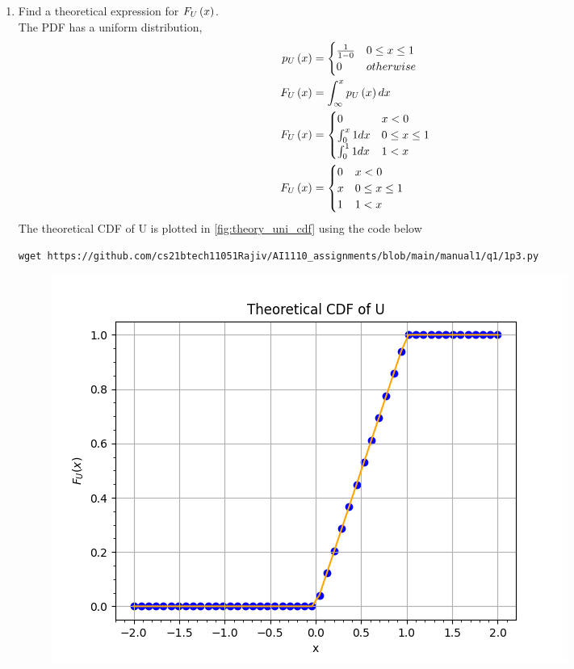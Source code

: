 \documentclass[journal,12pt,twocolumn]{IEEEtran}
\renewcommand\thesection{\arabic{section}}
\begin{document}
\begin{enumerate}[label=\thesection.\arabic*
,ref=\thesection.\theenumi]
%
\item
Find a theoretical expression for $F_{U}\left(x\right)$.
\\
\solution The PDF has a uniform distribution,
\begin{align}
    p_U\left(x\right) &=
        \begin{cases}\frac{1}{1-0} & 0 \le x \le 1 \\
        0 & otherwise
    \end{cases}\\
    F_{U}\left(x\right) &= \int^{x}_{\infty} p_U\left(x\right) dx \\
    F_U\left(x\right) &=
    \begin{cases}  
        0 & x < 0\\
        \int^{x}_{0} 1 dx & 0 \le x \le 1 \\
        \int^{1}_{0} 1 dx & 1 < x
    \end{cases}\\
    F_U\left(x\right) &=
    \begin{cases}  
        0 & x < 0\\
        x & 0 \le x \le 1 \\
        1 & 1 < x
    \end{cases}
    \label{eq:F_U}
\end{align}
\solution  The theoretical CDF of U is plotted in \ref{fig:theory_uni_cdf} using the code below
\begin{lstlisting}
wget https://github.com/cs21btech11051Rajiv/AI1110_assignments/blob/main/manual1/q1/1p3.py
\end{lstlisting}
\begin{figure}
    \centering
    \includegraphics[width=\columnwidth]{./figs/fig1.3.png}

\end{figure}
\end{enumerate}
\end{document}

